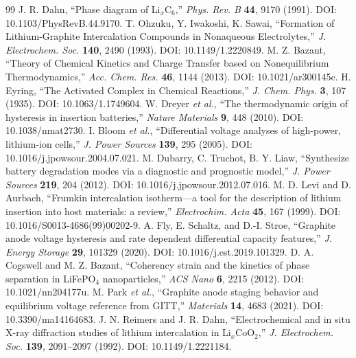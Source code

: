 \documentclass[11pt,a4paper]{article}
\begin{document}
\begin{thebibliography}{99}
 J. R. Dahn, ``Phase diagram of Li$_x$C$_6$,'' \emph{Phys. Rev. B} \textbf{44}, 9170 (1991). DOI: 10.1103/PhysRevB.44.9170.
 T. Ohzuku, Y. Iwakoshi, K. Sawai, ``Formation of Lithium-Graphite Intercalation Compounds in Nonaqueous Electrolytes,'' \emph{J. Electrochem. Soc.} \textbf{140}, 2490 (1993). DOI: 10.1149/1.2220849.
 M. Z. Bazant, ``Theory of Chemical Kinetics and Charge Transfer based on Nonequilibrium Thermodynamics,'' \emph{Acc. Chem. Res.} \textbf{46}, 1144 (2013). DOI: 10.1021/ar300145c.
 H. Eyring, ``The Activated Complex in Chemical Reactions,'' \emph{J. Chem. Phys.} \textbf{3}, 107 (1935). DOI: 10.1063/1.1749604.
 W. Dreyer \emph{et al.}, ``The thermodynamic origin of hysteresis in insertion batteries,'' \emph{Nature Materials} \textbf{9}, 448 (2010). DOI: 10.1038/nmat2730.
 I. Bloom \emph{et al.}, ``Differential voltage analyses of high-power, lithium-ion cells,'' \emph{J. Power Sources} \textbf{139}, 295 (2005). DOI: 10.1016/j.jpowsour.2004.07.021.
 M. Dubarry, C. Truchot, B. Y. Liaw, ``Synthesize battery degradation modes via a diagnostic and prognostic model,'' \emph{J. Power Sources} \textbf{219}, 204 (2012). DOI: 10.1016/j.jpowsour.2012.07.016.
 M. D. Levi and D. Aurbach, ``Frumkin intercalation isotherm---a tool for the description of lithium insertion into host materials: a review,'' \emph{Electrochim. Acta} \textbf{45}, 167 (1999). DOI: 10.1016/S0013-4686(99)00202-9.
 A. Fly, E. Schaltz, and D.-I. Stroe, ``Graphite anode voltage hysteresis and rate dependent differential capacity features,'' \emph{J. Energy Storage} \textbf{29}, 101329 (2020). DOI: 10.1016/j.est.2019.101329.
 D. A. Cogswell and M. Z. Bazant, ``Coherency strain and the kinetics of phase separation in LiFePO$_4$ nanoparticles,'' \emph{ACS Nano} \textbf{6}, 2215 (2012). DOI: 10.1021/nn204177u.
 M. Park \emph{et al.}, ``Graphite anode staging behavior and equilibrium voltage reference from GITT,'' \emph{Materials} \textbf{14}, 4683 (2021). DOI: 10.3390/ma14164683.
 J. N. Reimers and J. R. Dahn, ``Electrochemical and in situ X-ray diffraction studies of lithium intercalation in Li$_x$CoO$_2$,'' \emph{J. Electrochem. Soc.} \textbf{139}, 2091--2097 (1992). DOI: 10.1149/1.2221184.

\end{thebibliography}
\end{document}
